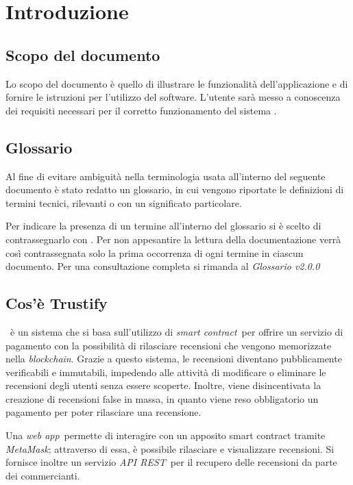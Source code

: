 \section{Introduzione}

\subsection{Scopo del documento}
Lo scopo del documento è quello di illustrare le funzionalità dell'applicazione e di fornire le istruzioni per l'utilizzo del software. L'utente sarà messo a conoscenza dei requisiti necessari per il corretto funzionamento del sistema \capName.

\subsection{Glossario}
Al fine di evitare ambiguità nella terminologia usata all'interno del seguente
documento è stato redatto un glossario, in cui vengono riportate le definizioni
di termini tecnici, rilevanti o con un significato particolare.

Per indicare
la presenza di un termine all'interno del glossario si è scelto di
contrassegnarlo con \glo. Per non appesantire la lettura della documentazione
verrà così contrassegnata solo la prima occorrenza di ogni termine in ciascun
documento.
Per una consultazione completa si rimanda al \textit{Glossario v2.0.0}

\subsection{Cos'è Trustify}
\capName\ è un sistema che si basa sull'utilizzo di \textit{smart contract}\glo\ per offrire un servizio di pagamento con la possibilità di rilasciare recensioni che vengono memorizzate nella \textit{blockchain}\glo. Grazie a questo sistema, le recensioni diventano pubblicamente verificabili e immutabili, impedendo alle attività di modificare o eliminare le recensioni degli utenti senza essere scoperte. Inoltre, viene disincentivata la creazione di recensioni false in massa, in quanto viene reso obbligatorio un pagamento per poter rilasciare una recensione.

Una \textit{web app}\glo\ permette di interagire con un apposito smart contract tramite \textit{MetaMask}\glo; attraverso di essa, è possibile rilasciare e visualizzare recensioni. Si fornisce inoltre un servizio \textit{API REST}\glo\ per il recupero delle recensioni da parte dei commercianti.